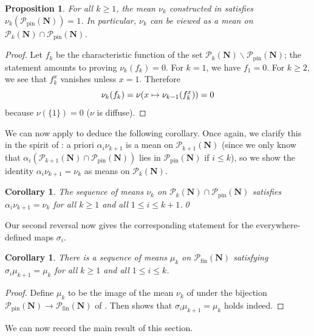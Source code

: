 \documentclass[12pt, pdflatex]{amsart}
\newtheorem{proposition}[theorem]{Proposition}
\newtheorem{corollary}[theorem]{Corollary}
\theoremstyle{definition}
\numberwithin{equation}{section}
\numberwithin{theorem}{section}
\newcommand{\NN}{\mathbf{N}}
\newcommand{\sP}{\mathscr{P}}
\newcommand{\sPf}{\mathscr{P}_\mathrm{fin}}
\newcommand{\sPt}{\mathscr{P}_\mathrm{pin}}
\begin{document}
\begin{proposition}
For all $k\geq 1$, the mean $\nu_k$ constructed in  satisfies $\nu_k(\sPt(\NN))=1$. In particular, $\nu_k$ can be viewed as a mean on $\sP_k(\NN) \cap \sPt(\NN)$.
\end{proposition}

\begin{proof}
Let $f_k$ be the characteristic function of the set $\sP_k(\NN) \smallsetminus \sPt(\NN)$; the statement amounts to proving $\nu_k(f_k)=0$. For $k=1$, we have $f_1 = 0$. For $k\geq 2$, we see that $f_k^x$ vanishes unless $x=1$. Therefore
\begin{equation*}
\nu_k(f_k) =  \nu \mleft( x \mapsto \nu_{k-1}\mleft( f_k^x\mright) \mright)  = 0
\end{equation*}
because $\nu(\{1\})=0$ ($\nu$ is diffuse).
\end{proof}

We can now apply  to deduce the following corollary. Once again, we clarify this in the spirit of : a priori $\alpha_i \nu_{k+1}$ is a mean on $\sP_{k+1}(\NN)$ (since we only know that $\alpha_i(\sP_{k+1}(\NN) \cap \sPt(\NN))$ lies in $\sPt(\NN)$ if $i\leq k$), so we show the identity $\alpha_i \nu_{k+1} = \nu_{k}$ as means on $\sP_k(\NN)$.


\begin{corollary}\label{cor:alpha-invariant}
The sequence of means $\nu_k$ on $\sP_k(\NN) \cap \sPt(\NN)$ satisfies $\alpha_i \nu_{k+1} = \nu_{k}$ for all $k\geq 1$ and all $1\leq i \leq k+1$.\qed
\end{corollary}

Our second reversal now gives the corresponding statement for the everywhere-defined maps $\sigma_i$.

\begin{corollary}\label{cor:sigma-equivariant}
There is a sequence of means $\mu_k$ on $\sPf(\NN)$ satisfying $\sigma_i \mu_{k+1} = \mu_{k}$ for all $k\geq 1$ and all $1\leq i \leq k$.
\end{corollary}

\begin{proof}
Define $\mu_k$ to be the image of the mean $\nu_k$ of  under the bijection $\sPt(\NN) \to \sPf(\NN)$ of . Then  shows that  $\sigma_i \mu_{k+1} = \mu_{k}$ holds indeed.
\end{proof}

We can now record the main result of this section.
\end{document}
